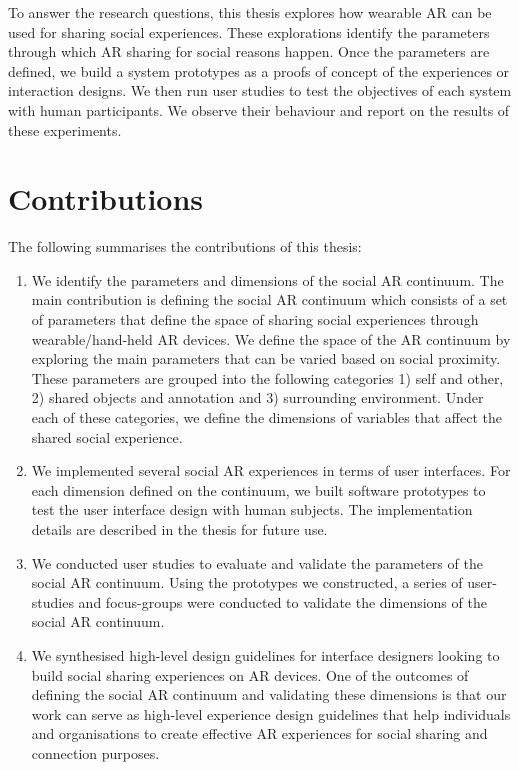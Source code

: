 To answer the research questions, this thesis explores how wearable AR can be used for sharing social experiences. These explorations identify the parameters through which AR sharing for social reasons happen. Once the parameters are defined, we build a system prototypes as a proofs of concept of the experiences or interaction designs. We then run user studies to test the objectives of each system with human participants. We observe their behaviour and report on the results of these experiments. 

\section{Contributions}

The following summarises the contributions of this thesis: 

\begin{enumerate}
    \item We identify the parameters and dimensions of the social AR continuum. The main contribution is defining the social AR continuum which consists of a set of parameters that define the space of sharing social experiences through wearable/hand-held AR devices. We define the space of the AR continuum by exploring the main parameters that can be varied based on social proximity. These parameters are grouped into the following categories 1) self and other, 2) shared objects and annotation and 3) surrounding environment. Under each of these categories, we define the dimensions of variables that affect the shared social experience.
    
    \item We implemented several social AR experiences in terms of user interfaces. For each dimension defined on the continuum, we built software prototypes to test the user interface design with human subjects. The implementation details are described in the thesis for future use.
    
    \item We conducted user studies to evaluate and validate the parameters of the social AR continuum. Using the prototypes we constructed, a series of user-studies and focus-groups were conducted to validate the dimensions of the social AR continuum.
    
    \item We synthesised high-level design guidelines for interface designers looking to build social sharing experiences on AR devices. One of the outcomes of defining the social AR continuum and validating these dimensions is that our work can serve as high-level experience design guidelines that help individuals and organisations to create effective AR experiences for social sharing and connection purposes.
\end{enumerate}

